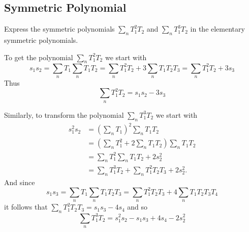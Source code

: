 \subsection{Symmetric Polynomial}
    \begin{ex}{14.10}
        Express the symmetric polynomials $\sum_n T_1^2T_2$ and $\sum_{n} T_1^3T_2$ in the elementary symmetric polynomials.
    \end{ex}
    \begin{sol}
        To get the polynomial $\sum_n T_1^2T_2$ we start with
        $$
            s_1s_2=\sum_n T_1\sum_n T_1T_2 = \sum_n T_1^2T_2+3\sum_n T_1T_2T_3 = \sum_n T_1^2T_2+3s_3
        $$
        Thus 
        $$
            \sum_n T_1^2T_2 = s_1s_2-3s_3
        $$

        Similarly, to transform the polynomial $\sum_{n} T_1^3T_2$ we start with
        \begin{align*}
            s_1^2s_2&=\left(\sum_nT_1\right)^2\sum_nT_1T_2\\
            &=\left(\sum_n T_1^2+2\sum_n T_1T_2\right)\sum_nT_1T_2\\
            &=\sum_nT_1^2\sum_n T_1T_2+2s_2^2\\
            &=\sum_nT_1^3T_2+\sum_n T_1^2T_2T_3+2s_2^2.
        \end{align*}
        And since
        $$
            s_1s_3=\sum_nT_1\sum_nT_1T_2T_3=\sum_nT_1^2T_2T_3+4\sum_n T_1T_2T_3T_4
        $$
        it follows that $\sum_n T_1^2T_2T_3=s_1s_3-4s_4$ and so
        $$
            \sum_{n} T_1^3T_2=s_1^2s_2-s_1s_3+4s_4-2s_2^2
        $$
    \end{sol}
        

